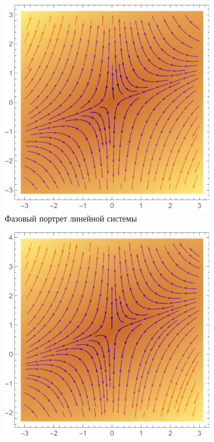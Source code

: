 \documentclass[12pt, a4paper]{article}
\begin{document}
\begin{enumerate}
\begin{figure}[H]
	\centering
	\begin{subfigure}[H]{0.4\textwidth}
		\includegraphics[width=\textwidth]{p5}
		\caption{Фазовый портрет линейной системы}
	\end{subfigure}
	\qquad\qquad
	\begin{subfigure}[H]{0.4\textwidth}
		\includegraphics[width=\textwidth]{p55}

\end{subfigure}
\end{figure}
\end{enumerate}
\end{document}
